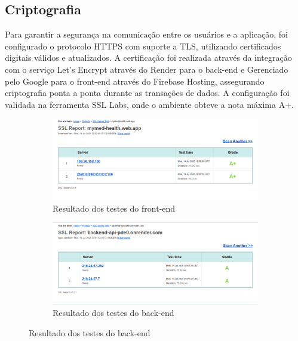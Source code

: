 \documentclass[
	article,			%
	12pt,				%
	oneside,			%
	a4paper,			%
    BIBLATEX,           %
	english,			%
	brazil,				%
	sumario=tradicional
	]{abntex2}
\begin{document}
\subsection{Criptografia}

Para garantir a segurança na comunicação entre os usuários e a aplicação, foi configurado o protocolo HTTPS com suporte a TLS, utilizando certificados digitais válidos e atualizados. A certificação foi realizada através da integração com o serviço Let's Encrypt através do Render para o back-end e Gerenciado pelo Google para o front-end através do Firebase Hosting, assegurando criptografia ponta a ponta durante as transações de dados. A configuração foi validada na ferramenta SSL Labs, onde o ambiente obteve a nota máxima A+.

\begin{figure}[h!]
    \caption{Resultados dos testes de criptografia.}
    \centering
    \begin{subfigure}[b]{0.45\textwidth}
        \centering
        \includegraphics[width=\textwidth]{Figuras/certificacao_front.png}
        \caption{Resultado dos testes do front-end}
    \end{subfigure}
    \hfill
    \begin{subfigure}[b]{0.45\textwidth}
        \centering
        \includegraphics[width=\textwidth]{Figuras/certificacao_back.png}
        \caption{Resultado dos testes do back-end}
    \end{subfigure}
    \label{fig:testes-criptografia}
\end{figure}
\end{document}
